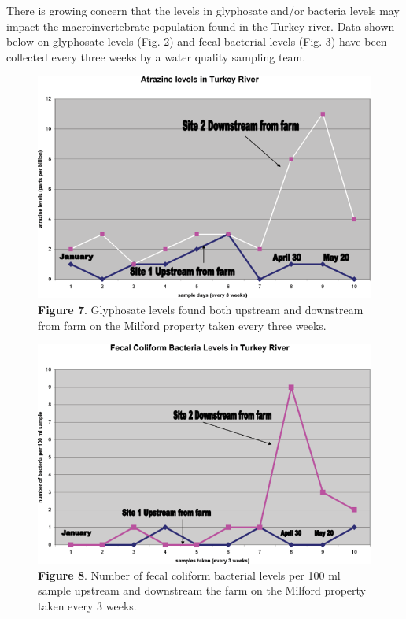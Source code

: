 \documentclass[
]{book}
\begin{document}
There is growing concern that the levels in glyphosate and/or bacteria levels may impact the macroinvertebrate population found in the Turkey river. Data shown below on glyphosate levels (Fig. 2) and fecal bacterial levels (Fig. 3) have been collected every three weeks by a water quality sampling team.

\begin{figure}
\centering
\includegraphics{images/figure7.png}
\caption{\textbf{Figure 7}. Glyphosate levels found both upstream and downstream from farm on the Milford property taken every three weeks.}
\end{figure}

\begin{figure}
\centering
\includegraphics{images/figure8.png}
\caption{\textbf{Figure 8}. Number of fecal coliform bacterial levels per 100 ml sample upstream and downstream the farm on the Milford property taken every 3 weeks.}
\end{figure}
\end{document}
